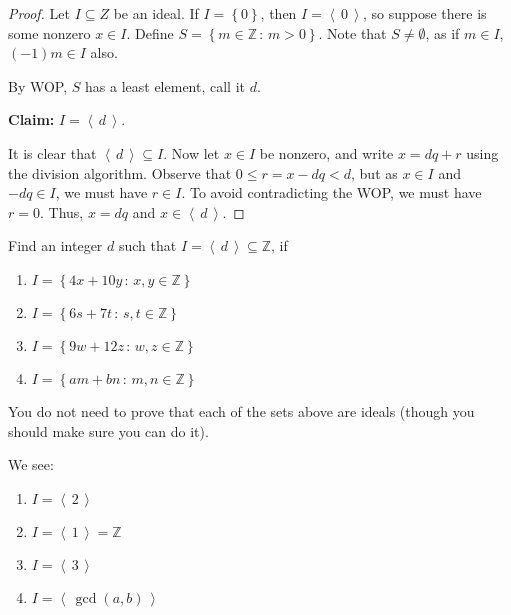 \documentclass[english,course]{lecture}
\renewcommand{\le}{\leqslant}
\newcommand{\ideal}[1]{\left\langle\, #1 \,\right\rangle}
\newenvironment{solution}[1][Solution]{\begin{trivlist}\pushQED{\qed}\item[\hskip \labelsep  \bfseries #1{}.\hspace{10pt}]}{\popQED\end{trivlist}}\renewcommand{\qedsymbol}{$\checkmark$}{\newenvironment{answer}{\renewcommand\qedsymbol{$\blacklozenge$}\begin{proof}[Answer]}{\end{proof}}}\newenvironment{answer}[1][Answer]{\begin{trivlist}\pushQED{\qed}\item[\hskip \labelsep  \bfseries #1{}.\hspace{10pt}]}{\popQED\end{trivlist}}\renewcommand{\qedsymbol}{$\lozenge$}
\newenvironment{hint}{\startimportant}{}
\def\startimportant#1\end{[{Hint:} #1]\end}
\theoremstyle{plain}
\def\set#1{\left\{ {#1} \right\}}
\def\setof#1#2{{\left\{#1\,\colon\,#2\right\}}}
\def\Z{{\mathbb Z}}
\def\presnotes{}
\begin{document}


\begin{proof}
	Let $I\subseteq Z$ be an ideal.
	If $I = \set{0}$, then $I = \ideal{0}$, so suppose there is some nonzero $x\in I$.
	Define $S = \setof{m\in \Z}{m > 0}$.
	Note that $S\ne \emptyset$, as if $m\in I$, $(-1)m \in I$ also.
	
	By WOP, $S$ has a least element, call it $d$.
	
	\textbf{Claim:} $I = \ideal{d}$.
	
	It is clear that $\ideal{d}\subseteq I$.
	Now let $x\in I$ be nonzero, and write $x = dq + r$ using the division algorithm.
	Observe that $0 \le r = x - dq < d$, but as $x\in I$ and $-dq \in I$, we must have $r\in I$.
	To avoid contradicting the WOP, we must have $r = 0$. Thus, $x = dq$ and $x\in \ideal{d}$.
\end{proof}

\presnotes


\begin{exer}
	Find an integer $d$ such that $I = \ideal{d}\subseteq \Z$, if
	\begin{enumerate}
		\item $I = \setof{4x+10y}{x,y\in\Z}$
		\item $I = \setof{6s+7t}{s,t\in\Z}$
		\item $I = \setof{9w+12z}{w,z\in\Z}$
		\item $I = \setof{am+bn}{m,n\in\Z}$
	\end{enumerate}
	You do not need to prove that each of the sets above are ideals (though you should make sure you can do it).
\end{exer}

\begin{solution}
	We see: 
	\begin{enumerate}
		\item $I= \ideal{2}$
		\item $I = \ideal{1} = \Z$
		\item $I = \ideal{3}$
		\item $I = \ideal{\gcd(a,b)}$
	\end{enumerate}
\end{solution}
\end{document}
